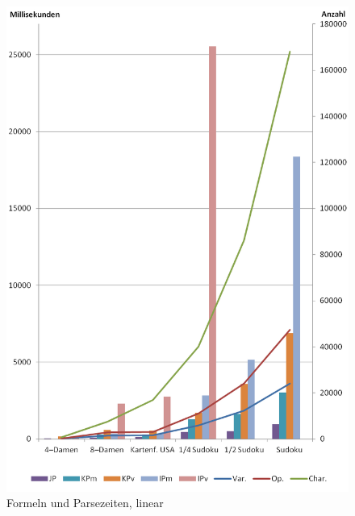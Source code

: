 \documentclass[ngerman,a4paper,abstracton,open=right,twoside=false,toc=listofnumbered,bibtotocnumbered]{scrreprt}
\begin{document}
\begin{figure}[!ht]
	\begin{center}
		\includegraphics{img/linear}
	\end{center}
	\caption{\label{parse-linear}Formeln und Parsezeiten, linear}
\end{figure}
\end{document}
